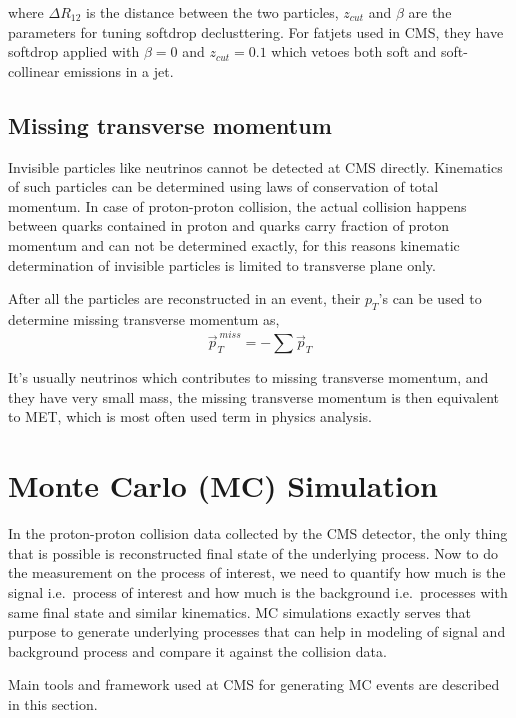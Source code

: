 where \( \Delta R_{12} \) is the distance between the two particles, \( z_{cut} \)
and \( \beta \) are the parameters for tuning softdrop declusttering.
For fatjets used in \gls{CMS}, they have softdrop applied with
\( \beta = 0\) and \( z_{cut} = 0.1\) which vetoes both soft
and soft-collinear emissions in a jet.

\subsection{
  Missing transverse momentum
}

Invisible particles like neutrinos cannot be detected at \gls{CMS} directly.
Kinematics of such particles can be determined using laws of conservation of
total momentum. In case of proton-proton collision,
the actual collision happens between quarks contained in
proton and quarks carry fraction of proton momentum
and can not be determined exactly, for this reasons kinematic determination
of invisible particles is limited to transverse plane only.

After all the particles are reconstructed in an event, their \( p_T \)'s
can be used to determine missing transverse momentum as,
%
\begin{equation}
  \vec{p}_{T}^{~miss} = - \sum \vec{p}_{T}
\end{equation}

It's usually neutrinos which contributes to missing transverse momentum,
and they have very small mass, the missing transverse momentum is then
equivalent to \gls{MET}, which is most often used term in physics analysis.

\section{
  Monte Carlo (MC) Simulation
 }

In the proton-proton collision data collected by the \gls{CMS} detector,
the only thing that is possible is reconstructed final state of the underlying
process. Now to do the measurement on the process of interest,
we need to quantify how much is the signal i.e.~process of interest
and how much is the background i.e.~processes with same final state and
similar kinematics. \gls{MC} simulations exactly serves that
purpose to generate underlying processes that can help in
modeling of signal and background process and compare it against the collision
data.

Main tools and framework
used at \gls{CMS} for generating \gls{MC} events
are described in this section.

